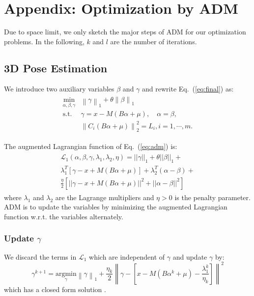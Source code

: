 \documentclass[10pt,twocolumn,letterpaper]{article}
\begin{document}
{\small


}


\section{Appendix: Optimization by ADM}
\label{sec:optimization} Due to space limit, we only sketch the
major steps of ADM for our optimization problems. In the
following, $k$ and $l$ are the number of iterations.

\subsection{3D Pose Estimation}
We introduce two auxiliary variables $\beta$ and $\gamma$ and rewrite Eq.~(\ref{eq:final}) as:
\begin{eqnarray}
\begin{array}{rl}
\underset{\alpha,\beta, \gamma}{\text{min}} & {\left\| \gamma \right\|_1 + \theta \left\| \beta \right\|_1 }\\
\text{s.t.} & \gamma = x-M \left(B \alpha +\mu \right) , \quad \alpha = \beta,  \\
& \left\| C_i \left(B \alpha+\mu \right) \right\|_2^2 = L_i,
i=1,\cdots,m.
\end{array}
\label{eq:adm}
\end{eqnarray}


The augmented Lagrangian function of  Eq.~(\ref{eq:adm}) is:
\begin{eqnarray*}
\begin{array}{rl}
\mathcal{L}_{1}(\alpha, \beta, \gamma, \lambda_1, \lambda_2,\eta)=
|| \gamma
||_1 + \theta || \beta ||_1 + \\
\lambda_1^T{[\gamma-x+M (B
\alpha+\mu)]}+\lambda_2^T{(\alpha-\beta)}+ \\
\frac{\eta}{2}{
\left[||\gamma-x+M (B \alpha +\mu)||^2+||\alpha-\beta||^2 \right]}
\end{array}
\label{eq:lagrange}
\end{eqnarray*}
where $\lambda_1$ and $\lambda_2$ are the Lagrange multipliers and
$\eta>0$ is the penalty parameter. ADM is to update the variables
by minimizing the augmented Lagrangian function w.r.t. the
variables alternately.

\subsubsection{Update $\gamma$}
We discard the terms in $\mathcal{L}_1$ which are independent of
$\gamma$ and update $\gamma$ by:
\begin{equation*}
\gamma^{k+1} = \underset{\gamma}{\text{argmin}}{\left\| \gamma
\right\|_1+\frac{\eta_k}{2} \left\| \gamma-\left[x-M (B \alpha^k +
\mu) - \frac{\lambda_1^k}{\eta_k}\right] \right\| ^2}
\label{eq:update_gamma}
\end{equation*}
which has a closed form solution \cite{liu2013linearized}.
\end{document}
